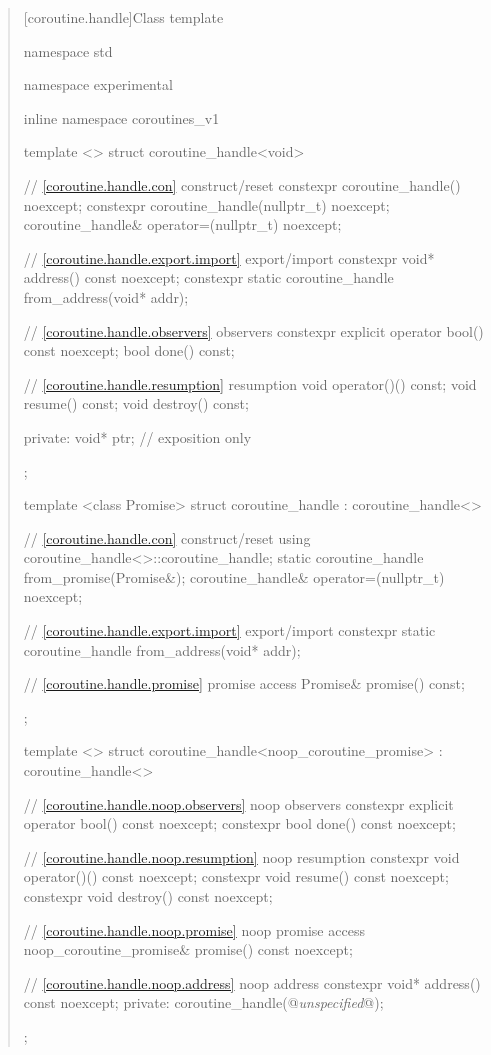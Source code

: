 \begin{quote}
[coroutine.handle]{Class template }

%
\begin{codeblock}
namespace std {
namespace experimental {
inline namespace coroutines_v1 {

  template <>
  struct coroutine_handle<void>
  {
    // \ref{coroutine.handle.con} construct/reset
    constexpr coroutine_handle() noexcept;		
    constexpr coroutine_handle(nullptr_t) noexcept;
    coroutine_handle& operator=(nullptr_t) noexcept;
    
    // \ref{coroutine.handle.export.import} export/import
    constexpr void* address() const noexcept;
    constexpr static coroutine_handle from_address(void* addr);
    
    // \ref{coroutine.handle.observers} observers
    constexpr explicit operator bool() const noexcept;
    bool done() const; 
    
    // \ref{coroutine.handle.resumption} resumption
    void operator()() const;
    void resume() const;
    void destroy() const;
    
  private:
    void* ptr; // exposition only
  };

  template <class Promise>
  struct coroutine_handle : coroutine_handle<>
  {
    // \ref{coroutine.handle.con} construct/reset
    using coroutine_handle<>::coroutine_handle;
    static coroutine_handle from_promise(Promise&);		
    coroutine_handle& operator=(nullptr_t) noexcept;

    // \ref{coroutine.handle.export.import} export/import
    constexpr static coroutine_handle from_address(void* addr);
    
    // \ref{coroutine.handle.promise} promise access
    Promise& promise() const;
  };

  template <> struct coroutine_handle<noop_coroutine_promise> : coroutine_handle<>
  {
  // \ref{coroutine.handle.noop.observers} noop observers
  constexpr explicit operator bool() const noexcept;
  constexpr bool done() const noexcept;

  // \ref{coroutine.handle.noop.resumption} noop resumption
  constexpr void operator()() const noexcept;
  constexpr void resume() const noexcept;
  constexpr void destroy() const noexcept;

  // \ref{coroutine.handle.noop.promise} noop promise access
  noop_coroutine_promise& promise() const noexcept;

  // \ref{coroutine.handle.noop.address} noop address
  constexpr void* address() const noexcept;
private:
  coroutine_handle(@\textit{unspecified}@);
};

}}}
\end{codeblock}
\end{quote}
